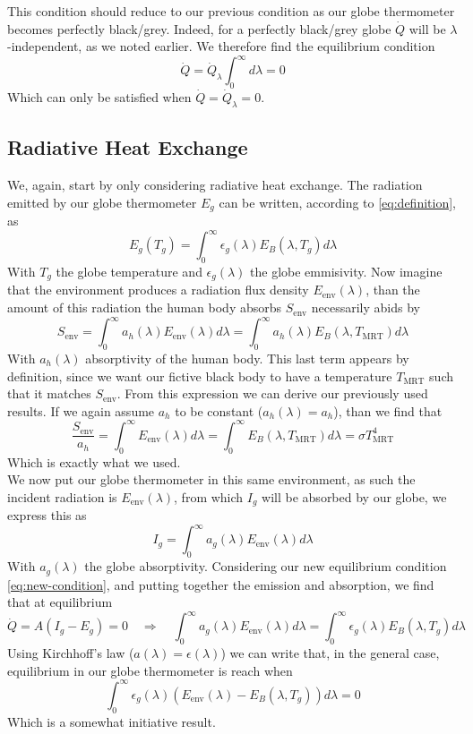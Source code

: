 \documentclass[]{scrartcl}
\begin{document}
This condition should reduce to our previous condition as our globe thermometer becomes perfectly black/grey. Indeed, for a perfectly black/grey globe $\dot{Q}$ will be $\lambda$-independent, as we noted earlier. We therefore find the equilibrium condition
$$
\dot{Q} = \dot{Q}_\lambda \int_{0}^{\infty}d\lambda = 0$$
Which can only be satisfied when $\dot{Q}=\dot{Q}_\lambda = 0$.

\subsection{Radiative Heat Exchange}
We, again, start by only considering radiative heat exchange. The radiation emitted by our globe thermometer $E_g$ can be written, according to \eqref{eq:definition}, as
$$
E_g(T_g) = \int_{0}^\infty\epsilon_g(\lambda) E_B(\lambda, T_g) d\lambda
$$
With $T_g$ the globe temperature and $\epsilon_g(\lambda)$ the globe emmisivity. Now imagine that the environment produces a radiation flux density $E_{\text{env}}(\lambda)$, than the amount of this radiation the human body absorbs $S_{\text{env}}$ necessarily abids by
\begin{equation}\label{necessary}
	\boxed{S_{\text{env}} = \int_{0}^\infty a_h(\lambda)E_{\text{env}}(\lambda) d\lambda = \int_{0}^{\infty} a_h(\lambda) E_B(\lambda, T_{\text{MRT}})d\lambda}
\end{equation}
With $a_h(\lambda)$ absorptivity of the human body. This last term appears by definition, since we want our fictive black body to have a temperature $T_{\text{MRT}}$ such that it matches $S_{\text{env}}$. From this expression we can derive our previously used results. If we again assume $a_h$ to be constant ($a_h(\lambda) = a_h$), than we find that $$
\frac{S_{\text{env}}}{a_h}=\int_{0}^\infty E_{\text{env}}(\lambda) d\lambda =\int_{0}^{\infty} E_B(\lambda, T_{\text{MRT}})d\lambda = \sigma T^4_{\text{MRT}}
$$
Which is exactly what we used.
\\

We now put our globe thermometer in this same environment, as such the incident radiation is $E_{\text{env}}(\lambda)$, from which $I_g$ will be absorbed by our globe, we express this as
\begin{equation}\label{incident}
	I_g = \int_{0}^{\infty} a_g(\lambda) E_{\text{env}}(\lambda) d\lambda
\end{equation}
With $a_g(\lambda)$ the globe absorptivity. Considering our new equilibrium condition \eqref{eq:new-condition}, and putting together the emission and absorption, we find that at equilibrium
$$
\dot{Q} = A\left(I_g - E_g\right) = 0 \quad \Longrightarrow \quad \int_{0}^{\infty} a_g(\lambda) E_{\text{env}}(\lambda) d\lambda = \int_{0}^\infty\epsilon_g(\lambda) E_B(\lambda, T_g) d\lambda
$$
Using Kirchhoff's law ($a(\lambda) = \epsilon(\lambda)$) we can write that, in the general case, equilibrium in our globe thermometer is reach when
\begin{equation}\label{general}
	\boxed{\int_{0}^{\infty}\epsilon_g(\lambda)\left(E_{\text{env}}(\lambda) - E_B(\lambda, T_g)\right)d\lambda = 0}
\end{equation}
Which is a somewhat initiative result.  
\\
\end{document}
